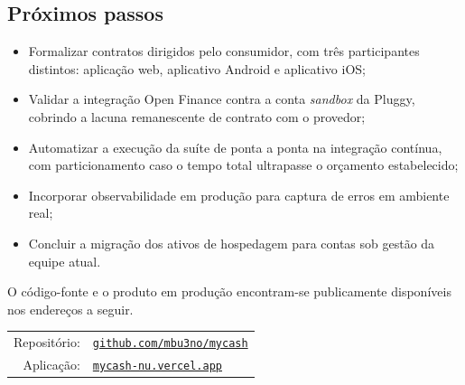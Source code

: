 \documentclass[12pt,a4paper]{article}
\begin{document}
\subsection{Próximos passos}

\begin{itemize}
    \item Formalizar contratos dirigidos pelo consumidor, com três participantes distintos: aplicação web, aplicativo Android e aplicativo iOS;
    \item Validar a integração Open Finance contra a conta \textit{sandbox} da Pluggy, cobrindo a lacuna remanescente de contrato com o provedor;
    \item Automatizar a execução da suíte de ponta a ponta na integração contínua, com particionamento caso o tempo total ultrapasse o orçamento estabelecido;
    \item Incorporar observabilidade em produção para captura de erros em ambiente real;
    \item Concluir a migração dos ativos de hospedagem para contas sob gestão da equipe atual.
\end{itemize}

O código-fonte e o produto em produção encontram-se publicamente disponíveis nos endereços a seguir.

\begin{center}
\begin{tabular}{@{}rl@{}}
Repositório: & \href{https://github.com/mbu3no/mycash}{\texttt{github.com/mbu3no/mycash}} \\
Aplicação: & \href{https://mycash-nu.vercel.app}{\texttt{mycash-nu.vercel.app}} \\
\end{tabular}
\end{center}
\end{document}
